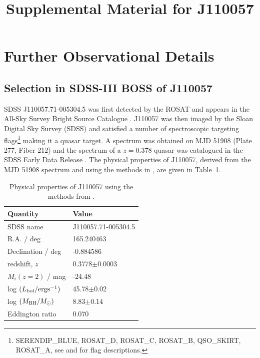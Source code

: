 \documentclass[11pt,a4paper]{article}
\begin{document}
   \title{Supplemental Material for J110057}
\maketitle

\section*{Further Observational Details}

\subsection*{Selection in SDSS-III BOSS of J110057}
SDSS J110057.71-005304.5 was first detected by the ROSAT and appears
in the All-Sky Survey Bright Source Catalogue \citep[RASS-BSC;
][]{Appenzeller1998, Voges1999}.  J110057 was then imaged by the Sloan
Digital Sky Survey (SDSS) and satisfied a number of spectroscopic
targeting flags\footnote{SERENDIP\_BLUE, ROSAT\_D, ROSAT\_C, ROSAT\_B,
QSO\_SKIRT, ROSAT\_A, see \citet{EDR} and \citet{Richards2002} for
flag descriptions.}  making it a quasar target. A spectrum was obtained 
on MJD 51908 (Plate 277, Fiber 212) and the spectrum of a $z=0.378$
quasar was catalogued in the SDSS Early Data Release
\citep{Stoughton2002, Schneider2002}. The physical properties of
J110057, derived from the MJD 51908 spectrum and using the methods in
\citet{Shen2011}, are given in Table~\ref{tab:Shen_props}.

\begin{table}[]
    \centering
    \begin{tabular}{l l }
      \hline \hline 
      Quantity                                         &  Value \\
      \hline 
      SDSS name                                     &   J110057.71-005304.5 \\
      R.A. / deg                &  165.240463 \\
      Declination / deg    &   -0.884586 \\ 
      redshift, $z$                                    &   0.3778$\pm$0.0003  \\
      $M_{i}(z=2)$  / mag                          &   -24.48  \\
      log $(L_{\rm bol} / {\rm erg s}^{-1}) $  &  45.78$\pm$0.02 \\
      log $(M_{\rm BH} / M_{\odot})  $           &  8.83$\pm$0.14 \\
      Eddington ratio                                &        0.070 \\
      \hline \hline 
    \end{tabular}
    \caption{Physical properties of J110057 using the methods from 
      \citet{Shen2011}.} 
    \label{tab:Shen_props}
\end{table}
\end{document}

